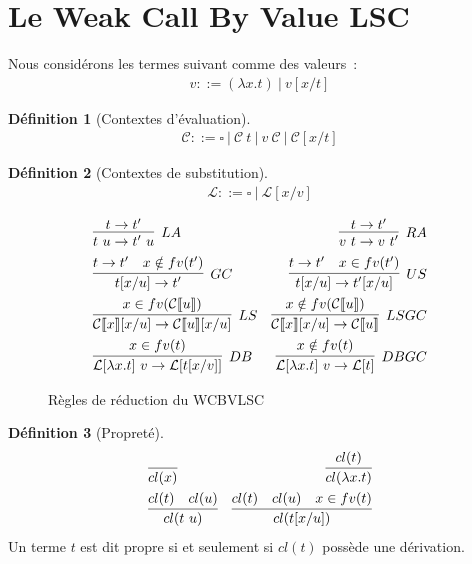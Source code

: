 \documentclass[11pt,a4paper]{article}
\theoremstyle{definition}
\newtheorem{definition}{Définition}[section]
\begin{document}
\section{Le Weak Call By Value LSC}
Nous considérons les termes suivant comme des valeurs~:
\begin{align*}
    v ::= (\lambda x.t)~|~v[x/t]
\end{align*}
\begin{definition}[Contextes d'évaluation]
\begin{align*}
    \mathcal{C} ::= \square~|~\mathcal{C}~t~|~v~\mathcal{C}~|~\mathcal{C}[x/t]
\end{align*}
\end{definition}
\begin{definition}[Contextes de substitution]
\begin{align*}
  \mathcal{L} ::= \square~|~\mathcal{L}[x/v]
\end{align*}
\end{definition}
\begin{figure}[!h]
    \centering
    \begin{align*}
    &\infer[LA]{t~u\rightarrow t'~u}{t \rightarrow t'}
 &\infer[RA]{v~t\rightarrow v~t'}{t \rightarrow t'}\\
&\infer[GC]{t[x/u]\rightarrow t'}{t \rightarrow t' & x \notin fv(t') }
&\infer[US]{t[x/u]\rightarrow t'[x/u]}{t \rightarrow t' & x \in fv(t')}\\
&\infer[LS]{\mathcal{C}\llbracket x \rrbracket [x/u]\rightarrow \mathcal{C}\llbracket u \rrbracket [x/u]}{x \in fv(\mathcal{C}\llbracket u \rrbracket) }
&\infer[LSGC]{\mathcal{C}\llbracket x \rrbracket [x/u]\rightarrow \mathcal{C}\llbracket u \rrbracket}{x \notin fv(\mathcal{C}\llbracket u \rrbracket) }\\
&\infer[DB]{\mathcal{L}[\lambda x.t]~v \rightarrow \mathcal{L}[t[x/v]]}{x\in fv(t)}
&\infer[DBGC]{\mathcal{L}[\lambda x.t]~v \rightarrow \mathcal{L}[t]}{x\notin fv(t)}
\end{align*}
    \caption{Règles de réduction du WCBVLSC}
\end{figure}

\begin{definition}[Propreté]
\begin{align*}
    &\infer{cl(x)}{}
 &\infer{cl(\lambda x.t)}{cl(t)}\\
 &\infer{cl(t~u)}{cl(t) & cl(u) }
&\infer{cl(t[x/u])}{cl(t)&cl(u)&x\in fv(t)}
  \end{align*}
Un terme $t$ est dit propre si et seulement si $cl(t)$ possède une dérivation.
\end{definition}
\end{document}
